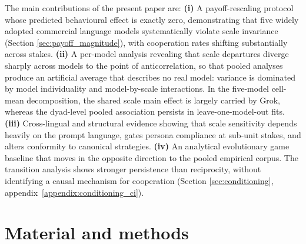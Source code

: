 \documentclass[11pt,a4paper]{article}
\begin{document}
The main contributions of the present
paper are: \textbf{(i)} A payoff-rescaling protocol whose predicted behavioural
effect is exactly zero, demonstrating that five widely adopted commercial language models systematically violate scale invariance (Section \ref{sec:payoff_magnitude}), with
cooperation rates shifting substantially across stakes. \textbf{(ii)} A
per-model analysis revealing that scale departures diverge sharply across
models to the point of anticorrelation, so that pooled analyses produce
an artificial average that describes no real model: variance is dominated by
model individuality and model-by-scale interactions. In the five-model
cell-mean decomposition, the shared scale main effect is largely carried by
Grok, whereas the dyad-level pooled association persists in leave-one-model-out
fits. \textbf{(iii)} Cross-lingual and structural evidence showing that scale
sensitivity depends heavily on the prompt language, gates persona compliance
at sub-unit stakes, and alters conformity to canonical strategies.
\textbf{(iv)} An analytical evolutionary game baseline that moves in the
opposite direction to the pooled empirical corpus. The transition analysis
shows stronger persistence than reciprocity, without identifying a causal
mechanism for cooperation (Section \ref{sec:conditioning}, appendix~\ref{appendix:conditioning_ci}).



\section{Material and methods}\label{sec:methodology}
\end{document}
